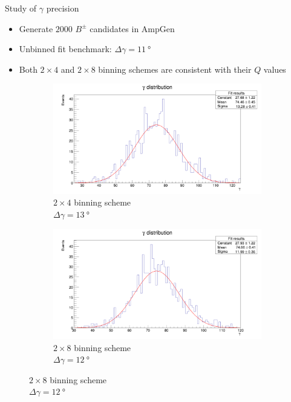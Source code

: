 \documentclass{beamer}
\begin{document}
\begin{frame}{Study of $\gamma$ precision}
  \begin{itemize}
    \item{Generate $2000$ $B^\pm$ candidates in AmpGen}
    \item{Unbinned fit benchmark: $\Delta\gamma = \SI{11}{\degree}$}
    \item{Both $2\times 4$ and $2\times 8$ binning schemes are consistent with their $Q$ values}
  \end{itemize}
  \begin{figure}
    \centering
    \vspace{-0.2cm}
    \begin{subfigure}{0.5\textwidth}
      \includegraphics[width = 1.0\textwidth]{Plots/GammaDistribution4BinsVariableWidth.png}
      \caption{$2\times 4$ binning scheme \\ $\Delta\gamma = \SI{13}{\degree}$}
    \end{subfigure}%
    \begin{subfigure}{0.5\textwidth}
      \includegraphics[width = 1.0\textwidth]{Plots/GammaDistribution8BinsVariableWidth.png}
      \caption{$2\times 8$ binning scheme \\ $\Delta\gamma = \SI{12}{\degree}$}
    \end{subfigure}
  \end{figure}
\end{frame}
\end{document}

